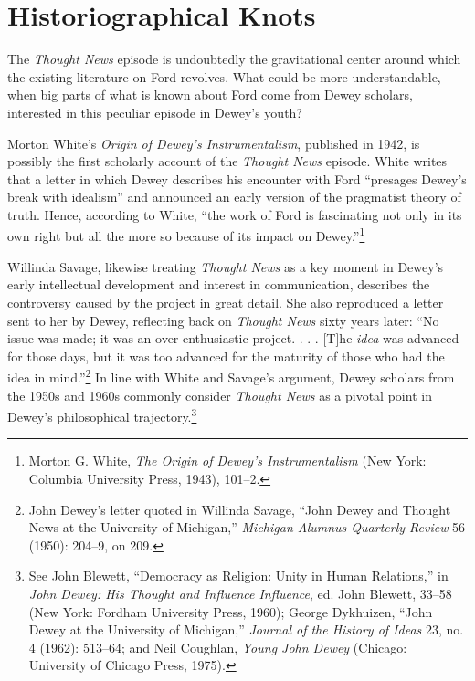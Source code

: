 \documentclass[openany,nobib]{tufte-book}
\begin{document}
\hypertarget{historiographical-knots}{%
\section{Historiographical Knots}\label{historiographical-knots}}

The \emph{Thought News} episode is undoubtedly the gravitational center
around which the existing literature on Ford revolves. What could be
more understandable, when big parts of what is known about Ford come
from Dewey scholars, interested in this peculiar episode in Dewey's
youth?

Morton White's \emph{Origin of Dewey's Instrumentalism}, published in
1942, is possibly the first scholarly account of the \emph{Thought News}
episode. White writes that a letter in which Dewey describes his
encounter with Ford ``presages Dewey's break with idealism'' and
announced an early version of the pragmatist theory of truth. Hence,
according to White, ``the work of Ford is fascinating not only in its
own right but all the more so because of its impact on
Dewey.''\footnote{Morton G. White, \emph{The Origin of Dewey's
  Instrumentalism} (New York: Columbia University Press, 1943), 101--2.}

Willinda Savage, likewise treating \emph{Thought News} as a key moment
in Dewey's early intellectual development and interest in communication,
describes the controversy caused by the project in great detail. She
also reproduced a letter sent to her by Dewey, reflecting back on
\emph{Thought News} sixty years later: ``No issue was made; it was an
over-enthusiastic project. . . . {[}T{]}he \emph{idea} was advanced for
those days, but it was too advanced for the maturity of those who had
the idea in mind.''\footnote{John Dewey's letter quoted in Willinda
  Savage, ``John Dewey and Thought News at the University of Michigan,''
  \emph{Michigan Alumnus Quarterly Review} 56 (1950): 204--9, on 209.}
In line with White and Savage's argument, Dewey scholars from the 1950s
and 1960s commonly consider \emph{Thought News} as a pivotal point in
Dewey's philosophical trajectory.\footnote{See John Blewett, ``Democracy
  as Religion: Unity in Human Relations,'' in \emph{John Dewey: His
  Thought and Influence Influence}, ed. John Blewett, 33­--58 (New York:
  Fordham University Press, 1960); George Dykhuizen, ``John Dewey at the
  University of Michigan,'' \emph{Journal of the History of Ideas} 23,
  no. 4 (1962): 513­--64; and Neil Coughlan, \emph{Young John Dewey}
  (Chicago: University of Chicago Press, 1975).}
\end{document}
